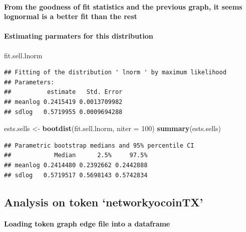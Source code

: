 \documentclass[]{article}
\newenvironment{Shaded}{\begin{snugshade}}{\end{snugshade}}
\newcommand{\KeywordTok}[1]{\textcolor[rgb]{0.13,0.29,0.53}{\textbf{#1}}}
\newcommand{\DataTypeTok}[1]{\textcolor[rgb]{0.13,0.29,0.53}{#1}}
\newcommand{\DecValTok}[1]{\textcolor[rgb]{0.00,0.00,0.81}{#1}}
\newcommand{\StringTok}[1]{\textcolor[rgb]{0.31,0.60,0.02}{#1}}
\newcommand{\NormalTok}[1]{#1}
\let\oldparagraph\paragraph
\renewcommand{\paragraph}[1]{\oldparagraph{#1}\mbox{}}
\begin{document}
\paragraph{From the goodness of fit statistics and the previous graph,
it seems lognormal is a better fit than the
rest}\label{from-the-goodness-of-fit-statistics-and-the-previous-graph-it-seems-lognormal-is-a-better-fit-than-the-rest}

\paragraph{Estimating parmaters for this
distribution}\label{estimating-parmaters-for-this-distribution-1}

\begin{Shaded}
\begin{Highlighting}[]
\NormalTok{fit.sell.lnorm}
\end{Highlighting}
\end{Shaded}

\begin{verbatim}
## Fitting of the distribution ' lnorm ' by maximum likelihood 
## Parameters:
##          estimate   Std. Error
## meanlog 0.2415419 0.0013709982
## sdlog   0.5719955 0.0009694288
\end{verbatim}

\begin{Shaded}
\begin{Highlighting}[]
\NormalTok{ests.sells <-}\StringTok{ }\KeywordTok{bootdist}\NormalTok{(fit.sell.lnorm, }\DataTypeTok{niter =} \DecValTok{100}\NormalTok{)}
\KeywordTok{summary}\NormalTok{(ests.sells)}
\end{Highlighting}
\end{Shaded}

\begin{verbatim}
## Parametric bootstrap medians and 95% percentile CI 
##            Median      2.5%     97.5%
## meanlog 0.2414480 0.2392662 0.2442888
## sdlog   0.5719517 0.5698143 0.5742834
\end{verbatim}

\subsection{\texorpdfstring{Analysis on token
`networkyocoinTX'}{Analysis on token networkyocoinTX}}\label{analysis-on-token-networkyocointx}

\paragraph{Loading token graph edge file into a
dataframe}\label{loading-token-graph-edge-file-into-a-dataframe-1}
\end{document}
